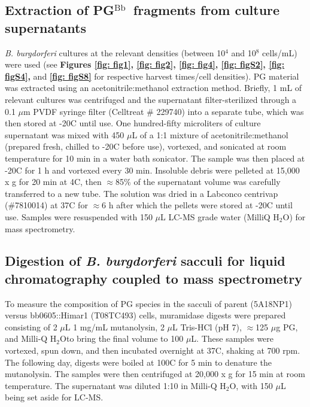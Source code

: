 \documentclass[twoside, watermark]{zHenriquesLab-StyleBioRxiv}
\newcommand{\HtwoO}{H$_\text{2}$O} %
\newcommand{\tmu}{$\mu$} %
\newcommand{\pgbb}{PG$^\text{Bb}$}
\begin{document}
\subsection*{Extraction of \pgbb~fragments from culture supernatants}
\textit{B. burgdorferi} cultures at the relevant densities (between 10$^\text{4}$ and 10$^\text{8}$ cells/mL) were used (see \textbf{Figures \ref{fig: fig1}, \ref{fig: fig2}, \ref{fig: fig4}, \ref{fig: figS2}, \ref{fig: figS4},} and \textbf{\ref{fig: figS8}} for respective harvest times/cell densities). PG material was extracted using an acetonitrile:methanol extraction method. Briefly, 1 mL of relevant cultures was centrifuged and the supernatant filter-sterilized through a 0.1 \tmu m PVDF syringe filter (Celltreat \# 229740) into a separate tube, which was then stored at -20\degree C until use. One hundred-fifty microliters of culture supernatant was mixed with 450 \tmu L of a 1:1 mixture of acetonitrile:methanol (prepared fresh, chilled to -20\degree C before use), vortexed, and sonicated at room temperature for 10 min in a water bath sonicator. The sample was then placed at -20\degree C for 1 h and vortexed every 30 min. Insoluble debris were pelleted at 15,000 x g for 20 min at 4\degree C, then $\approx$85\% of the supernatant volume was carefully transferred to a new tube. The solution was dried in a Labconco centrivap (\#7810014) at 37\degree C for $\approx$6 h after which the pellets were stored at -20\degree C until use. Samples were resuspended with 150 \tmu L LC-MS grade water (MilliQ \HtwoO) for mass spectrometry.

\subsection*{Digestion of \textit{B. burgdorferi} sacculi for liquid chromatography coupled to mass spectrometry}
To measure the composition of PG species in the sacculi of parent (5A18NP1) versus bb0605::Himar1 (T08TC493) cells, muramidase digests were prepared consisting of 2 \tmu L 1 mg/mL mutanolysin, 2 \tmu L Tris-HCl (pH 7), $\approx$125 \tmu g PG, and Milli-Q \HtwoO to bring the final volume to 100 \tmu L. These samples were vortexed, spun down, and then incubated overnight at 37\degree C, shaking at 700 rpm. The following day, digests were boiled at 100\degree C for 5 min to denature the mutanolysin. The samples were then centrifuged at 20,000 x g for 15 min at room temperature. The supernatant was diluted 1:10 in Milli-Q \HtwoO, with 150 \tmu L being set aside for LC-MS.
\end{document}

